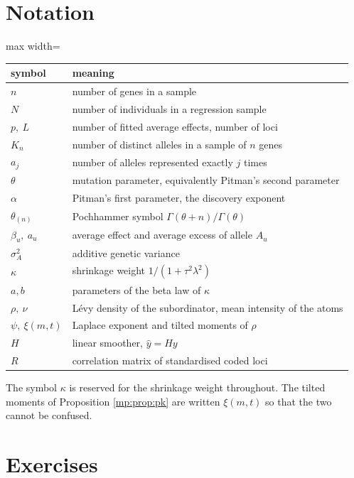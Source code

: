 \section{Notation}
\label{mp:app:notation}

\begin{center}
\begin{adjustbox}{max width=\textwidth}
\begin{tabular}{ll}
\toprule
symbol & meaning \\
\midrule
$n$ & number of genes in a sample \\
$N$ & number of individuals in a regression sample \\
$p,\ L$ & number of fitted average effects, number of loci \\
$K_n$ & number of distinct alleles in a sample of $n$ genes \\
$a_j$ & number of alleles represented exactly $j$ times \\
$\theta$ & mutation parameter, equivalently Pitman's second parameter \\
$\alpha$ & Pitman's first parameter, the discovery exponent \\
$\theta_{(n)}$ & Pochhammer symbol $\Gamma(\theta+n)/\Gamma(\theta)$ \\
$\beta_u,\ a_u$ & average effect and average excess of allele $A_u$ \\
$\sigma_A^2$ & additive genetic variance \\
$\kappa$ & shrinkage weight $1/(1+\tau^2\lambda^2)$ \\
$a,b$ & parameters of the beta law of $\kappa$ \\
$\rho,\ \nu$ & L\'evy density of the subordinator, mean intensity of the atoms \\
$\psi,\ \xi(m,t)$ & Laplace exponent and tilted moments of $\rho$ \\
$H$ & linear smoother, $\hat y=Hy$ \\
$R$ & correlation matrix of standardised coded loci \\
\bottomrule
\end{tabular}
\end{adjustbox}
\end{center}

\medskip
The symbol $\kappa$ is reserved for the shrinkage weight throughout. The tilted moments of
Proposition \ref{mp:prop:pk} are written $\xi(m,t)$ so that the two cannot be confused.

\section{Exercises}
\label{mp:sec:ex}

